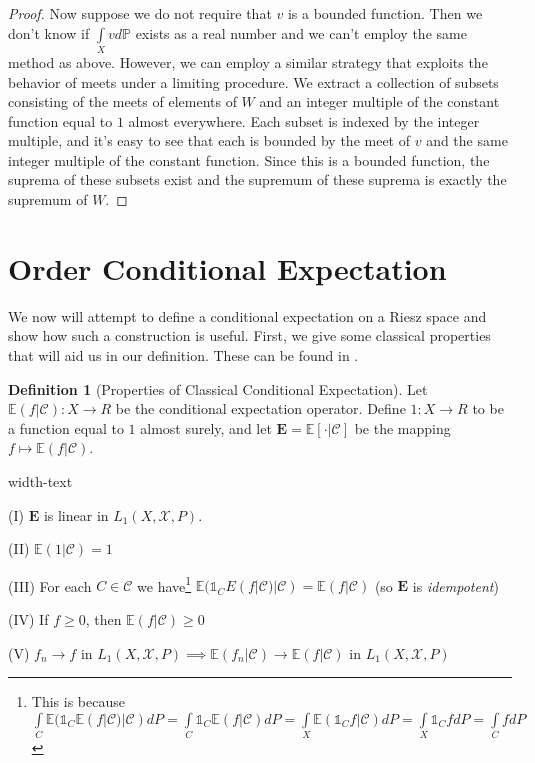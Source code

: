 \documentclass[letterpaper,10pt,oneside,onecolumn,reqno]{amsart}
\newcommand{\C}{\mathcal C}
\newcommand{\E}{\mathbb E}
\renewcommand{\P}{\mathbb P}
\newcommand{\X}{\mathcal X}
\newcommand{\one}{\mathds{1}}      %
\theoremstyle{definition}
\newtheorem{defn}{Definition}
\begin{document}
\begin{proof}
Now suppose we do not require that $v$ is a bounded function. Then we
don't know if $\int\limits_X v d\P$ exists as a real number and we
can't employ the same method as above. However, we can employ a
similar strategy that exploits the behavior of meets under a limiting
procedure. We extract a collection of subsets consisting of the meets
of elements of $W$ and an integer multiple of the constant function
equal to $1$ almost everywhere. Each subset is indexed by the integer
multiple, and it's easy to see that each is bounded by the meet of $v$
and the same integer multiple of the constant function. Since this is
a bounded function, the suprema of these subsets exist and the
supremum of these suprema is exactly the supremum of $W$. 
\end{proof}


\part{Order Conditional Expectation}

We now will attempt to define a conditional expectation on a Riesz
space and show how such a construction is useful. First, we give some
classical properties that will aid us in our definition. These can be
found in \cite{2010conditional}.

\begin{defn}[Properties of Classical Conditional Expectation]\label{def:14}
  Let $\E(f|\C) : X \to R$ be the conditional expectation
  operator. Define $1 : X \to R$ to be a function equal to $1$ almost
  surely, and let $\mathbf{E}=\E[\cdot|\C]$ be the mapping $f \mapsto
  \E(f|\C)$.
  \begin{deflist}{width-text}
  \item[(I)] $\mathbf{E}$ is linear in $L_1(X,\X,P)$.
  \item[(II)] $\E(1|\C) = 1$
  \item[(III)] For each $C \in \C$ we have\footnote{This is because
      $\int\limits_C\E(\one_C \E(f|\C)|\C)dP=\int\limits_C \one_C
      \E(f|\C)dP=\int\limits_X \E(\one_C f | \C)dP=\int\limits_X
      \one_C fdP=\int\limits_C fdP$ \label{fn:1}} $\E(\one_C
    E(f|\C)|\C) = \E(f|\C)$ (so $\mathbf{E}$ is \emph{idempotent})
  \item[(IV)] If $f \geq 0$, then $\E(f|\C) \geq 0$
  \item[(V)] $f_n \rightarrow f$ in $L_1(X,\X,P) \implies \E(f_n|\C)
    \rightarrow \E(f|\C)$ in $L_1(X,\X,P)$
  \end{deflist}
\end{defn}
\end{document}
